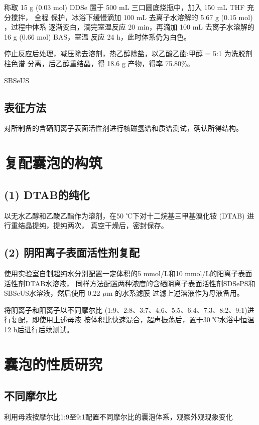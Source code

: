 \documentclass[bachelor,fandolfonts,replaceperiod]{jnuthesis}
\begin{document}
    称取 15 g (0.03 mol) DDSe 置于 500 mL 三口圆底烧瓶中，加入 150 mL THF 充分搅拌，
    全程  保护，冰浴下缓慢滴加 100 mL 去离子水溶解的 5.67 g (0.15 mol) ，过程中体系
    逐渐变白，滴完室温反应 20 min，再滴加 100 mL 去离子水溶解的 16 g (0.66 mol) BAS，室温
    反应 24 h，此时体系仍为白色。
    
    停止反应后处理，减压除去溶剂，热乙醇除盐，以乙酸乙酯:甲醇 = 5:1 为洗脱剂柱色谱
    分离，后乙醇重结晶，得 18.6 g 产物，得率 75.80\%。
    
    SBSeUS
    
    \subsection{表征方法}
    对所制备的含硒阴离子表面活性剂进行核磁氢谱和质谱测试，确认所得结构。
    
    \section{复配囊泡的构筑}
    \subsection*{(1) DTAB的纯化}
    以无水乙醇和乙酸乙酯作为溶剂，在50 ℃下对十二烷基三甲基溴化铵 (DTAB) 进行重结晶提纯，提纯两次，
    真空干燥后，密封保存。
    
    \subsection*{(2) 阴阳离子表面活性剂复配}
    使用实验室自制超纯水分别配置一定体积的5 mmol/L和10 mmol/L的阳离子表面活性剂DTAB水溶液，
    同样方法配置两种浓度的含硒阴离子表面活性剂SDSePS和SBSeUS水溶液，然后使用 0.22 $\mu$m 的水系滤膜
    过滤上述溶液作为母液备用。
    
    将阴离子和阳离子以不同摩尔比 (1:9、2:8、3:7、4:6、5:5、6:4、7:3、8:2、9:1)进行复配，即使用上述母液
    按体积比快速混合，超声振荡后，置于30 ℃水浴中恒温12 h后进行后续测试。
        
    \section{囊泡的性质研究}
    \subsection{不同摩尔比}
    利用母液按摩尔比1:9至9:1配置不同摩尔比的囊泡体系，观察外观现象变化
    
\end{document}
